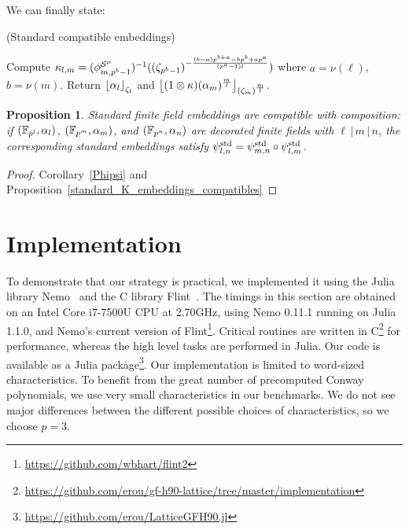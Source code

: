 \documentclass{sig-alternate}
\newtheorem{proposition}[theorem]{Proposition}
\begin{document}
We can finally state:
\begin{algorithm}
  \caption{(Standard compatible embeddings)}
  \label{algo:std_embed}
  \begin{algorithmic}[1]
  \STATE Compute $\kappa_{l,m}=({\phi^{\mathcal{S}^\mu}_{{m},{p^b-1}}})^{-1}((\zeta_{p^b-1})^{-\frac{(b-a)p^{b+a}-bp^b+ap^a}{(p^a-1)l}})$ where $a=\nu(\ell)$, $b=\nu(m)$.
  \STATE Return $\left\lfloor \alpha_l \right\rfloor_{\zeta_l}$ and $\left\lfloor (1\otimes\kappa)(\alpha_m)^{\frac{m}{l}} \right\rfloor_{(\zeta_m)^{\frac{m}{l}}}$.
  \end{algorithmic}
\end{algorithm}
\begin{proposition}
\label{standard_ff_embeddings_compatibles}
Standard finite field embeddings are compatible with composition:
if $(\mathbb{F}_{p^l},\alpha_l)$, $(\mathbb{F}_{p^m},\alpha_m)$, and $(\mathbb{F}_{p^n},\alpha_n)$ are decorated finite fields
with $\ell\,|\,m\,|\,n$, the corresponding standard embeddings
satisfy ${\psi^{\mathrm{std}}_{{l},{n}}}={\psi^{\mathrm{std}}_{{m},{n}}}\circ{\psi^{\mathrm{std}}_{{l},{m}}}$.
\end{proposition}
\begin{proof}
Corollary~\ref{Phipsi} and Proposition~\ref{standard_K_embeddings_compatibles}
\end{proof}

\section{Implementation}
\label{sec:implementation}

To demonstrate that our strategy is practical, we implemented it using the
Julia library Nemo~\cite{Fieker:2017:NCA:3087604.3087611} and the C library
Flint~\cite{flint}. The timings in this section are obtained on an Intel Core
i7-7500U CPU at 2.70GHz, using Nemo 0.11.1
running on Julia 1.1.0, and Nemo's current version of
Flint\footnote{\url{https://github.com/wbhart/flint2}}. Critical routines are written in
C\footnote{\url{https://github.com/erou/gf-h90-lattice/tree/master/implementation}}
for performance, whereas the high level tasks are performed in Julia. Our code
is available as a Julia
package\footnote{\url{https://github.com/erou/LatticeGFH90.jl}}. Our
implementation is limited to word-sized characteristics. To benefit from the
great number of precomputed Conway polynomials, we use very small
characteristics in our benchmarks. We do not see major differences between the
different possible choices of characteristics, so we choose $p=3$.
\end{document}

